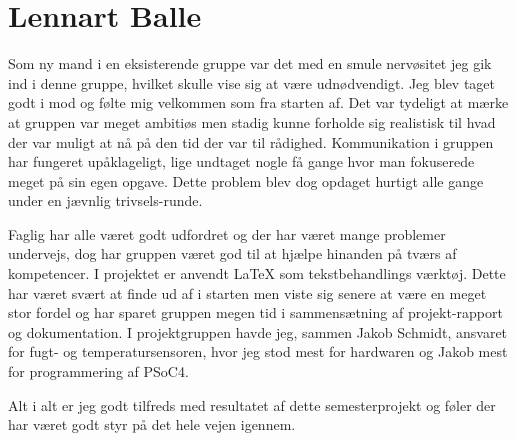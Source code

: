 \section{Lennart Balle}
Som ny mand i en eksisterende gruppe var det med en smule nervøsitet jeg gik ind i denne gruppe, hvilket skulle vise sig at være udnødvendigt. Jeg blev taget godt i mod og følte mig velkommen som fra starten af. Det var tydeligt at mærke at gruppen var meget ambitiøs men stadig kunne forholde sig realistisk til hvad der var muligt at nå på den tid der var til rådighed. Kommunikation i gruppen har fungeret upåklageligt, lige undtaget nogle få gange hvor man fokuserede meget på sin egen opgave. Dette problem blev dog opdaget hurtigt alle gange under en jævnlig trivsels-runde.

Faglig har alle været godt udfordret og der har været mange problemer undervejs, dog har gruppen været god til at hjælpe hinanden på tværs af kompetencer. I projektet er anvendt LaTeX som tekstbehandlings værktøj. Dette har været svært at finde ud af i starten men viste sig senere at være en meget stor fordel og har sparet gruppen megen tid i sammensætning af projekt-rapport og dokumentation. I projektgruppen havde jeg, sammen Jakob Schmidt, ansvaret for fugt- og temperatursensoren, hvor jeg stod mest for hardwaren og Jakob mest for programmering af PSoC4. 

Alt i alt er jeg godt tilfreds med resultatet af dette semesterprojekt og føler der har været godt styr på det hele vejen igennem.